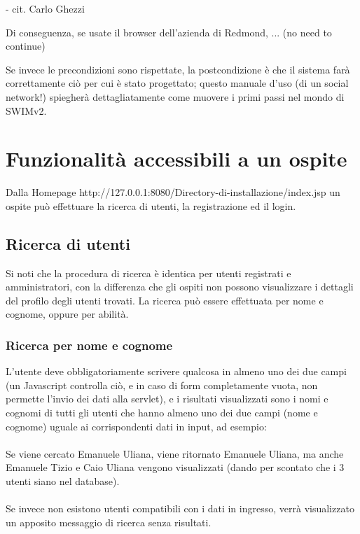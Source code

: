\documentclass[a4paper,12pt]{article}
\begin{document}
- cit. Carlo Ghezzi


\vspace{0.5cm}
Di conseguenza, se usate il browser dell'azienda di Redmond, ... (no need to continue)

Se invece le precondizioni sono rispettate, la postcondizione è che il sistema farà correttamente ciò per cui è stato progettato; questo manuale d'uso (di un social network!) spiegherà dettagliatamente come
muovere i primi passi nel mondo di SWIMv2.

\pagebreak

\section{Funzionalità accessibili a un ospite}
Dalla Homepage http://127.0.0.1:8080/Directory-di-installazione/index.jsp un ospite può effettuare la ricerca di utenti, la registrazione ed il login.

\subsection{Ricerca di utenti}
Si noti che la procedura di ricerca è identica per utenti registrati e amministratori, con la differenza che gli ospiti non possono visualizzare i dettagli del profilo degli utenti
trovati.
\linebreak
La ricerca può essere effettuata per nome e cognome, oppure per abilità.

\subsubsection{Ricerca per nome e cognome}
L'utente deve obbligatoriamente scrivere qualcosa in almeno uno dei due campi (un Javascript controlla ciò, e in caso di form completamente vuota, non permette l'invio dei dati alla
servlet), e i risultati visualizzati sono i nomi e cognomi di tutti gli utenti che hanno almeno uno dei due campi (nome e cognome) uguale ai corrispondenti dati in input, ad esempio:
\\
\vspace{0.1cm}
\\
Se viene cercato Emanuele Uliana, viene ritornato Emanuele Uliana, ma anche Emanuele Tizio e Caio Uliana vengono visualizzati (dando per scontato che i 3 utenti siano nel database).
\\
\vspace{0.1cm}
\\
Se invece non esistono utenti compatibili con i dati in ingresso, verrà visualizzato un apposito messaggio di ricerca senza risultati.
\end{document}
